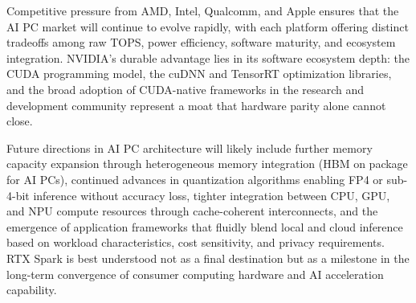 \documentclass[conference]{IEEEtran}
\begin{document}
Competitive pressure from AMD, Intel, Qualcomm, and Apple ensures that the AI PC market will continue to evolve rapidly, with each platform offering distinct tradeoffs among raw TOPS, power efficiency, software maturity, and ecosystem integration. NVIDIA's durable advantage lies in its software ecosystem depth: the CUDA programming model, the cuDNN and TensorRT optimization libraries, and the broad adoption of CUDA-native frameworks in the research and development community represent a moat that hardware parity alone cannot close.

Future directions in AI PC architecture will likely include further memory capacity expansion through heterogeneous memory integration (HBM on package for AI PCs), continued advances in quantization algorithms enabling FP4 or sub-4-bit inference without accuracy loss, tighter integration between CPU, GPU, and NPU compute resources through cache-coherent interconnects, and the emergence of application frameworks that fluidly blend local and cloud inference based on workload characteristics, cost sensitivity, and privacy requirements. RTX Spark is best understood not as a final destination but as a milestone in the long-term convergence of consumer computing hardware and AI acceleration capability.
\end{document}
